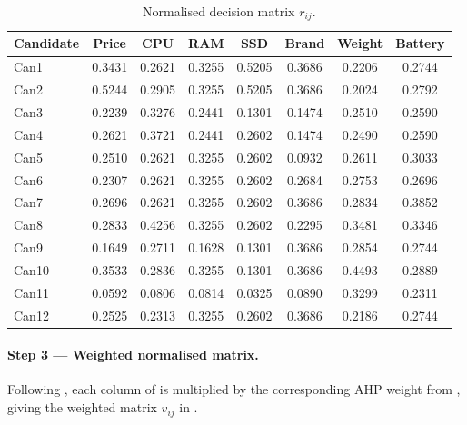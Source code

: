 \begin{table}[htbp]
\centering
\caption{Normalised decision matrix $r_{ij}$.}
\label{tab:topsis-normalised}
\begin{tabular}{@{}lccccccc@{}}
\toprule
Candidate & Price & CPU & RAM & SSD & Brand & Weight & Battery \\
\midrule
Can1  & 0.3431 & 0.2621 & 0.3255 & 0.5205 & 0.3686 & 0.2206 & 0.2744 \\
Can2  & 0.5244 & 0.2905 & 0.3255 & 0.5205 & 0.3686 & 0.2024 & 0.2792 \\
Can3  & 0.2239 & 0.3276 & 0.2441 & 0.1301 & 0.1474 & 0.2510 & 0.2590 \\
Can4  & 0.2621 & 0.3721 & 0.2441 & 0.2602 & 0.1474 & 0.2490 & 0.2590 \\
Can5  & 0.2510 & 0.2621 & 0.3255 & 0.2602 & 0.0932 & 0.2611 & 0.3033 \\
Can6  & 0.2307 & 0.2621 & 0.3255 & 0.2602 & 0.2684 & 0.2753 & 0.2696 \\
Can7  & 0.2696 & 0.2621 & 0.3255 & 0.2602 & 0.3686 & 0.2834 & 0.3852 \\
Can8  & 0.2833 & 0.4256 & 0.3255 & 0.2602 & 0.2295 & 0.3481 & 0.3346 \\
Can9  & 0.1649 & 0.2711 & 0.1628 & 0.1301 & 0.3686 & 0.2854 & 0.2744 \\
Can10 & 0.3533 & 0.2836 & 0.3255 & 0.1301 & 0.3686 & 0.4493 & 0.2889 \\
Can11 & 0.0592 & 0.0806 & 0.0814 & 0.0325 & 0.0890 & 0.3299 & 0.2311 \\
Can12 & 0.2525 & 0.2313 & 0.3255 & 0.2602 & 0.3686 & 0.2186 & 0.2744 \\
\bottomrule
\end{tabular}
\end{table}

\paragraph{Step 3 --- Weighted normalised matrix.}
Following , each column of  is multiplied by
the corresponding AHP weight from , giving the weighted matrix
$v_{ij}$ in .

